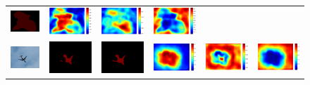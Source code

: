 \documentclass[10pt,twocolumn,letterpaper]{article}
\begin{document}
\begin{figure}
\begin{tabular}{c c c c c c}
   \includegraphics[height=0.09\linewidth]{fig/voc12/res_sharenet/2010_005344.png} &
   \includegraphics[height=0.09\linewidth]{fig/voc12/att1/2010_005344.pdf} &
   \includegraphics[height=0.09\linewidth]{fig/voc12/att2/2010_005344.pdf} &
   \includegraphics[height=0.09\linewidth]{fig/voc12/att3/2010_005344.pdf} \\
   \includegraphics[height=0.09\linewidth]{fig/voc12/img/2010_005888.jpg} &
   \includegraphics[height=0.09\linewidth]{fig/voc12/res_baseline/2010_005888.png} &
   \includegraphics[height=0.09\linewidth]{fig/voc12/res_sharenet/2010_005888.png} &
   \includegraphics[height=0.09\linewidth]{fig/voc12/att1/2010_005888.pdf} &
   \includegraphics[height=0.09\linewidth]{fig/voc12/att2/2010_005888.pdf} &
   \includegraphics[height=0.09\linewidth]{fig/voc12/att3/2010_005888.pdf} \\

\end{tabular}
\end{figure}
\end{document}
